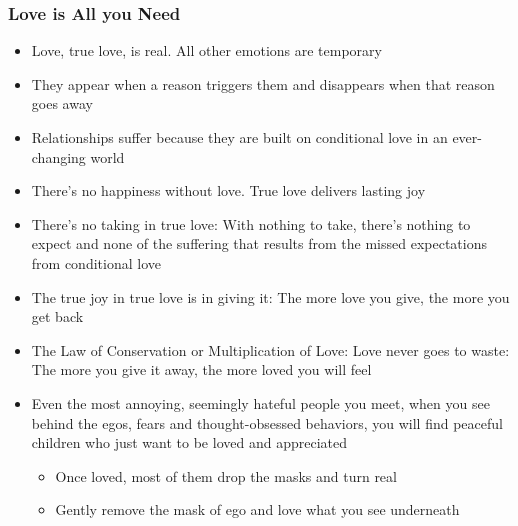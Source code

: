 \begin{frame}[fragile]\frametitle{Love is All you Need}
\begin{itemize}
\item Love, true love, is real. All other emotions are temporary
\item They appear when a reason triggers them and disappears when that reason goes away
\item Relationships suffer because they are built on conditional love in an ever-changing world
\item There’s no happiness without love. True love delivers lasting joy
\item There’s no taking in true love: With nothing to take, there’s nothing to expect and none of the suffering that results from the missed expectations from conditional love
\item The true joy in true love is in giving it: The more love you give, the more you get back
\item The Law of Conservation or Multiplication of Love: Love never goes to waste: The more you give it away, the more loved you will feel
\item Even the most annoying, seemingly hateful people you meet, when you see behind the egos, fears and thought-obsessed behaviors, you will find peaceful children who just want to be loved and appreciated
	\begin{itemize}
	\item Once loved, most of them drop the masks and turn real
	\item Gently remove the mask of ego and love what you see underneath
	\end{itemize}
\end{itemize}

\end{frame}

